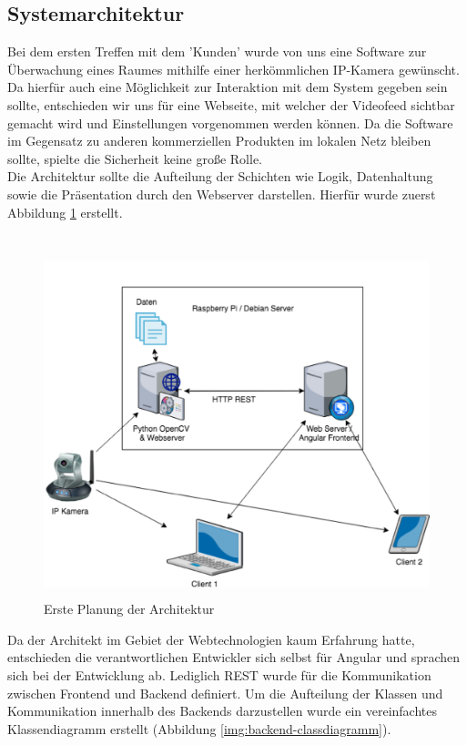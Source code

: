 \subsection{Systemarchitektur}
Bei dem ersten Treffen mit dem 'Kunden' wurde von uns eine Software zur Überwachung eines Raumes mithilfe einer herkömmlichen IP-Kamera gewünscht.
Da hierfür auch eine Möglichkeit zur Interaktion mit dem System gegeben sein sollte, entschieden wir uns für eine Webseite, mit welcher der Videofeed sichtbar gemacht wird und Einstellungen vorgenommen werden können. Da die Software im Gegensatz zu anderen kommerziellen Produkten im lokalen Netz bleiben sollte,
spielte die Sicherheit keine große Rolle.\\
Die Architektur sollte die Aufteilung der Schichten wie Logik, Datenhaltung sowie die Präsentation durch den Webserver darstellen.
Hierfür wurde zuerst Abbildung \ref{img:architecture-sketch} erstellt.\\\\
\begin{figure}[h]
	\centering
	\includegraphics[height=10cm]{content/pictures/architecture-sketch.png}
	\caption{Erste Planung der Architektur}
	\label{img:architecture-sketch}
\end{figure}
Da der Architekt im Gebiet der Webtechnologien kaum Erfahrung hatte, entschieden die verantwortlichen Entwickler sich selbst für Angular und sprachen sich bei
der Entwicklung ab. Lediglich REST wurde für die Kommunikation zwischen Frontend und Backend definiert. 
Um die Aufteilung der Klassen und Kommunikation innerhalb des Backends darzustellen wurde ein vereinfachtes Klassendiagramm erstellt (Abbildung \ref{img:backend-classdiagramm}).\\
